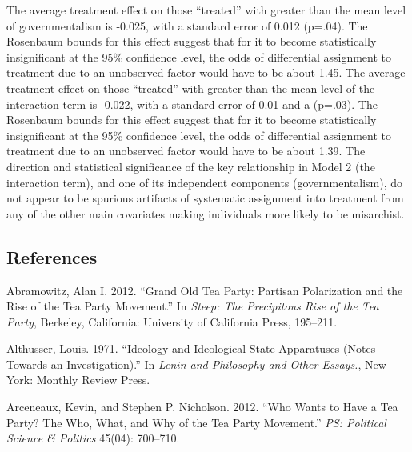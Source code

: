 \documentclass[12pt,]{article}
\begin{document}
The average treatment effect on those ``treated'' with greater than the
mean level of governmentalism is -0.025, with a standard error of 0.012
(p=.04). The Rosenbaum bounds for this effect suggest that for it to
become statistically insignificant at the 95\% confidence level, the
odds of differential assignment to treatment due to an unobserved factor
would have to be about 1.45. The average treatment effect on those
``treated'' with greater than the mean level of the interaction term is
-0.022, with a standard error of 0.01 and a (p=.03). The Rosenbaum
bounds for this effect suggest that for it to become statistically
insignificant at the 95\% confidence level, the odds of differential
assignment to treatment due to an unobserved factor would have to be
about 1.39. The direction and statistical significance of the key
relationship in Model 2 (the interaction term), and one of its
independent components (governmentalism), do not appear to be spurious
artifacts of systematic assignment into treatment from any of the other
main covariates making individuals more likely to be misarchist.

\clearpage

\subsection{References}\label{references}

\setlength{\parindent}{-0.2in} \setlength{\leftskip}{0.2in}
\setlength{\parskip}{8pt} \vspace*{-0.2in} \noindent

Abramowitz, Alan I. 2012. ``Grand Old Tea Party: Partisan Polarization
and the Rise of the Tea Party Movement.'' In \emph{Steep: The
Precipitous Rise of the Tea Party}, Berkeley, California: University of
California Press, 195--211.

Althusser, Louis. 1971. ``Ideology and Ideological State Apparatuses
(Notes Towards an Investigation).'' In \emph{Lenin and Philosophy and
Other Essays.}, New York: Monthly Review Press.

Arceneaux, Kevin, and Stephen P. Nicholson. 2012. ``Who Wants to Have a
Tea Party? The Who, What, and Why of the Tea Party Movement.'' \emph{PS:
Political Science \& Politics} 45(04): 700--710.
\end{document}
